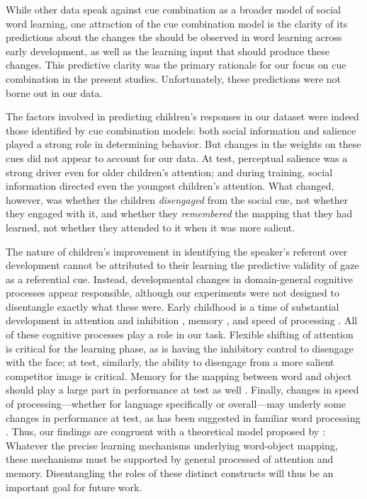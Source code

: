 \documentclass[man,floatsintext]{apa6}
\begin{document}
While other data speak against cue combination as a broader model of social word learning, one attraction of the cue combination model is the clarity of its predictions about the changes the should be observed in word learning across early development, as well as the learning input that should produce these changes. This predictive clarity was the primary rationale for our focus on cue combination in the present studies. Unfortunately, these predictions were not borne out in our data. 

The factors involved in predicting children's responses in our dataset were indeed those identified by cue combination models: both social information and salience played a strong role in determining behavior. But changes in the weights on these cues did not appear to account for our data. At test, perceptual salience was a strong driver even for older children's attention; and during training, social information directed even the youngest children's attention. What changed, however, was whether the children \emph{disengaged} from the social cue, not whether they engaged with it, and whether they \emph{remembered} the mapping that they had learned, not whether they attended to it when it was more salient. 

The nature of children's improvement in identifying the speaker's referent over development cannot be attributed to their learning the predictive validity of gaze as a referential cue. Instead, developmental changes in domain-general cognitive processes appear responsible, although our experiments were not designed to disentangle exactly what these were. Early childhood is a time of substantial development in attention and inhibition \cite{smith1999b,diamond1989}, memory \cite{cowan1997}, and speed of processing \cite{kail1991,dougherty1997}. All of these cognitive processes play a role in our task. Flexible shifting of attention is critical for the learning phase, as is having the inhibitory control to disengage with the face; at test, similarly, the ability to disengage from a more salient competitor image is critical. Memory for the mapping between word and object should play a large part in performance at test as well \cite{Horst2008}. Finally, changes in speed of processing---whether for language specifically or overall---may underly some changes in performance at test, as has been suggested in familiar word processing \cite{fernald1998,fernald2006}. Thus, our findings are congruent with a theoretical model proposed by : Whatever the precise learning mechanisms underlying word-object mapping, these mechanisms must be supported by general processed of attention and memory. Disentangling the roles of these distinct constructs will thus be an important goal for future work. 
\end{document}
